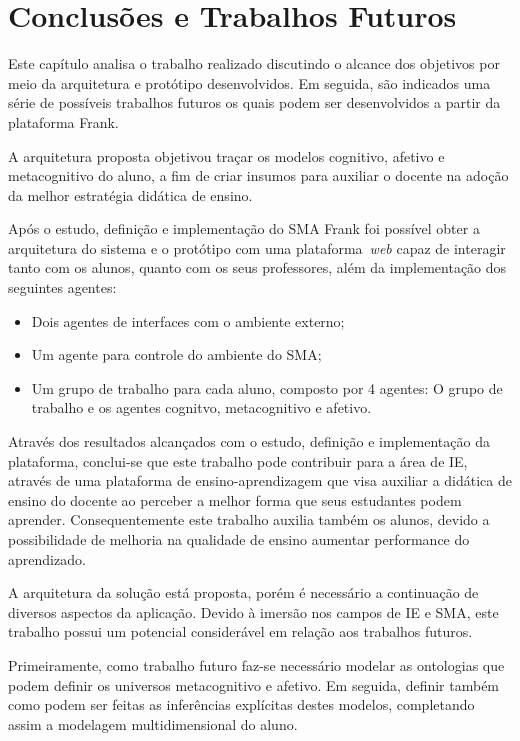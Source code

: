 \chapter{Conclusões e Trabalhos Futuros}
Este capítulo analisa o trabalho realizado discutindo o alcance dos objetivos por meio da arquitetura e protótipo desenvolvidos. Em seguida, são indicados uma série de possíveis trabalhos futuros os quais podem ser desenvolvidos a partir da plataforma Frank.

A arquitetura proposta objetivou traçar os modelos cognitivo, afetivo e metacognitivo do aluno, a fim de criar insumos para auxiliar o docente na adoção da melhor estratégia didática de ensino.

Após o estudo, definição e implementação do SMA Frank foi possível obter a arquitetura do sistema e o protótipo com uma plataforma~\emph{web} capaz de interagir tanto com os alunos, quanto com os seus professores, além da implementação dos seguintes agentes:
\begin{itemize}
 	\item Dois agentes de interfaces com o ambiente externo;
	\item Um agente para controle do ambiente do SMA;
	\item Um grupo de trabalho para cada aluno, composto por 4 agentes: O grupo de trabalho e os agentes cognitvo, metacognitivo e afetivo.
\end{itemize}

Através dos resultados alcançados com o estudo, definição e implementação da plataforma, conclui-se que este trabalho pode contribuir para a área de IE, através de uma plataforma de ensino-aprendizagem que visa auxiliar a didática de ensino do docente ao perceber a melhor forma que seus estudantes podem aprender. Consequentemente este trabalho auxilia também os alunos, devido a possibilidade de melhoria na qualidade de ensino aumentar performance do aprendizado. 

A arquitetura da solução está proposta, porém é necessário a continuação de diversos aspectos da aplicação. Devido à imersão nos campos de IE e SMA, este trabalho possui um potencial considerável em relação aos trabalhos futuros.

Primeiramente, como trabalho futuro faz-se necessário modelar as ontologias que podem definir os universos metacognitivo e afetivo. Em seguida, definir também como podem ser feitas as inferências explícitas destes modelos, completando assim a modelagem multidimensional do aluno.

